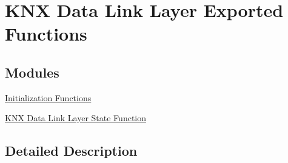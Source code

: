 \hypertarget{group___k_n_x___d_l___exported___functions}{}\section{K\+NX Data Link Layer Exported Functions}
\label{group___k_n_x___d_l___exported___functions}
\subsection*{Modules}
\begin{DoxyCompactItemize}
\item 
\hyperlink{group___k_n_x___d_l___exported___functions___group1}{Initialization Functions}
\item 
\hyperlink{group___k_n_x___d_l___exported___functions___group2}{K\+N\+X Data Link Layer State Function}
\end{DoxyCompactItemize}


\subsection{Detailed Description}
